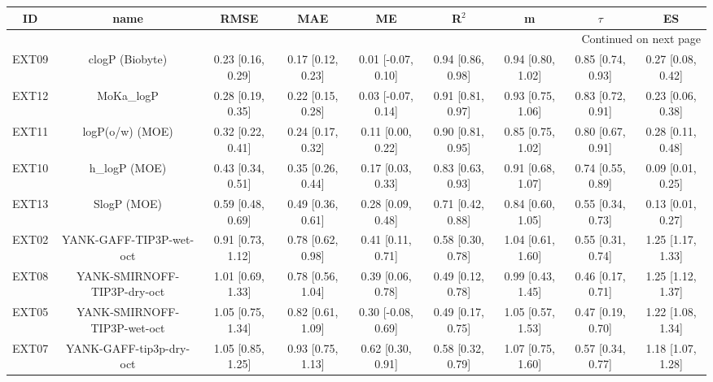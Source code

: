 \documentclass{article}
\begin{document}
\begin{center}
\scriptsize
\begin{longtable}{|ccccccccc|}
\toprule
    ID &                            name &               RMSE &                MAE &                   ME &              R$^2$ &                  m &             $\tau$ &                 ES \\
\midrule
\endhead
\midrule
\multicolumn{9}{r}{{Continued on next page}} \\
\midrule
\endfoot

\bottomrule
\endlastfoot
 EXT09 &                 clogP (Biobyte) &  0.23 [0.16, 0.29] &  0.17 [0.12, 0.23] &   0.01 [-0.07, 0.10] &  0.94 [0.86, 0.98] &  0.94 [0.80, 1.02] &  0.85 [0.74, 0.93] &  0.27 [0.08, 0.42] \\
 EXT12 &                      MoKa\_logP &  0.28 [0.19, 0.35] &  0.22 [0.15, 0.28] &   0.03 [-0.07, 0.14] &  0.91 [0.81, 0.97] &  0.93 [0.75, 1.06] &  0.83 [0.72, 0.91] &  0.23 [0.06, 0.38] \\
 EXT11 &                 logP(o/w) (MOE) &  0.32 [0.22, 0.41] &  0.24 [0.17, 0.32] &    0.11 [0.00, 0.22] &  0.90 [0.81, 0.95] &  0.85 [0.75, 1.02] &  0.80 [0.67, 0.91] &  0.28 [0.11, 0.48] \\
 EXT10 &                   h\_logP (MOE) &  0.43 [0.34, 0.51] &  0.35 [0.26, 0.44] &    0.17 [0.03, 0.33] &  0.83 [0.63, 0.93] &  0.91 [0.68, 1.07] &  0.74 [0.55, 0.89] &  0.09 [0.01, 0.25] \\
 EXT13 &                     SlogP (MOE) &  0.59 [0.48, 0.69] &  0.49 [0.36, 0.61] &    0.28 [0.09, 0.48] &  0.71 [0.42, 0.88] &  0.84 [0.60, 1.05] &  0.55 [0.34, 0.73] &  0.13 [0.01, 0.27] \\
 EXT02 &         YANK-GAFF-TIP3P-wet-oct &  0.91 [0.73, 1.12] &  0.78 [0.62, 0.98] &    0.41 [0.11, 0.71] &  0.58 [0.30, 0.78] &  1.04 [0.61, 1.60] &  0.55 [0.31, 0.74] &  1.25 [1.17, 1.33] \\
 EXT08 &     YANK-SMIRNOFF-TIP3P-dry-oct &  1.01 [0.69, 1.33] &  0.78 [0.56, 1.04] &    0.39 [0.06, 0.78] &  0.49 [0.12, 0.78] &  0.99 [0.43, 1.45] &  0.46 [0.17, 0.71] &  1.25 [1.12, 1.37] \\
 EXT05 &     YANK-SMIRNOFF-TIP3P-wet-oct &  1.05 [0.75, 1.34] &  0.82 [0.61, 1.09] &   0.30 [-0.08, 0.69] &  0.49 [0.17, 0.75] &  1.05 [0.57, 1.53] &  0.47 [0.19, 0.70] &  1.22 [1.08, 1.34] \\
 EXT07 &         YANK-GAFF-tip3p-dry-oct &  1.05 [0.85, 1.25] &  0.93 [0.75, 1.13] &    0.62 [0.30, 0.91] &  0.58 [0.32, 0.79] &  1.07 [0.75, 1.60] &  0.57 [0.34, 0.77] &  1.18 [1.07, 1.28] \\

\end{longtable}
\end{center}
\end{document}
